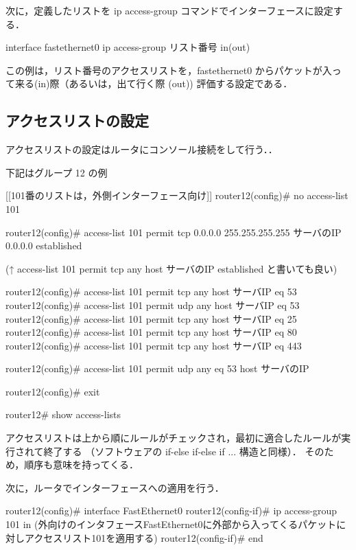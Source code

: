 次に，定義したリストを ip access-group コマンドでインターフェースに設定する．

\begin{cli}
interface fastethernet0
  ip access-group リスト番号 in(out)
\end{cli}

この例は，リスト番号のアクセスリストを，fastethernet0 からパケットが入っ
て来る(in)際（あるいは，出て行く際 (out)) 評価する設定である．

\subsection*{アクセスリストの設定}

アクセスリストの設定はルータにコンソール接続をして行う．．

\begin{cli}
下記はグループ 12 の例

[[101番のリストは，外側インターフェース向け]]
router12(config)# no access-list 101

router12(config)# access-list 101 permit tcp 0.0.0.0 255.255.255.255
サーバのIP 0.0.0.0 established

(↑ access-list 101 permit tcp any host サーバのIP established
 と書いても良い)

router12(config)# access-list 101 permit tcp any host サーバIP eq 53
router12(config)# access-list 101 permit udp any host サーバIP eq 53
router12(config)# access-list 101 permit tcp any host サーバIP eq 25
router12(config)# access-list 101 permit tcp any host サーバIP eq 80
router12(config)# access-list 101 permit tcp any host サーバIP eq 443

router12(config)# access-list 101 permit udp any eq 53 host サーバのIP

router12(config)# exit

router12# show access-lists
\end{cli}

アクセスリストは上から順にルールがチェックされ，最初に適合したルールが実行されて終了する
（ソフトウェアの if-else if-else if ... 構造と同様）．
そのため，順序も意味を持ってくる．

次に，ルータでインターフェースへの適用を行う．

\begin{cli}
router12(config)# interface FastEthernet0
router12(config-if)# ip access-group 101 in
                (外向けのインタフェースFastEthernet0に外部から入ってくるパケットに対しアクセスリスト101を適用する)
router12(config-if)# end
\end{cli}

